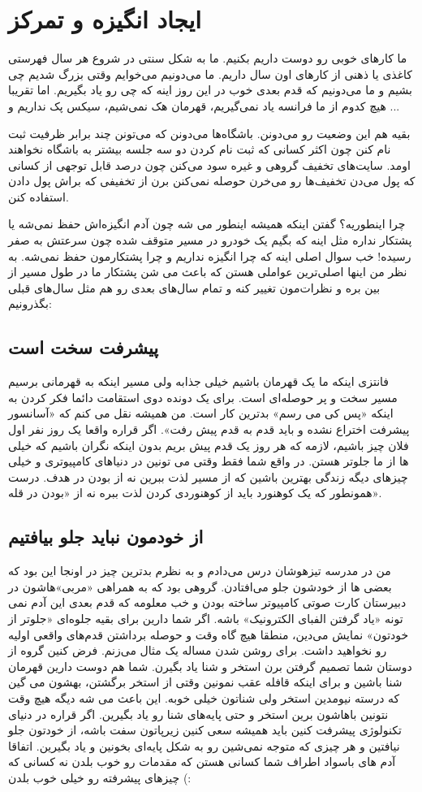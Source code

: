 \section{ایجاد انگیزه و تمرکز}
ما کارهای خوبی رو دوست داریم بکنیم. ما به شکل سنتی در شروع هر سال فهرستی کاغذی یا ذهنی از کارهای اون سال داریم. ما می‌دونیم می‌خوایم وقتی بزرگ شدیم چی بشیم و ما می‌دونیم که قدم بعدی خوب در این روز اینه که چی رو یاد بگیریم. اما تقریبا هیچ کدوم از ما فرانسه یاد نمی‌گیریم، قهرمان هک نمی‌شیم، سیکس پک نداریم و ...

بقیه هم این وضعیت رو می‌دونن. باشگاه‌ها می‌دونن که می‌تونن چند برابر ظرفیت ثبت نام کنن چون اکثر کسانی که ثبت نام کردن دو سه جلسه بیشتر به باشگاه نخواهند اومد. سایت‌های تخفیف گروهی و غیره سود می‌کنن چون درصد قابل توجهی از کسانی که پول می‌دن تخفیف‌ها رو می‌خرن حوصله نمی‌کنن برن از تخفیفی که براش پول دادن استفاده کنن.

چرا اینطوریه؟ گفتن اینکه همیشه اینطور می شه چون آدم انگیزه‌اش حفظ نمی‌شه یا پشتکار نداره مثل اینه که بگیم یک خودرو در مسیر متوقف شده چون سرعتش به صفر رسیده! خب سوال اصلی اینه که چرا انگیزه نداریم و چرا پشتکارمون حفظ نمی‌شه. به نظر من اینها اصلی‌ترین عواملی هستن که باعث می شن پشتکار ما در طول مسیر از بین بره و نظرات‌مون تغییر کنه و تمام سال‌های بعدی رو هم مثل سال‌های قبلی بگذرونیم:
\subsection*{پیشرفت سخت است}
فانتزی اینکه ما یک قهرمان باشیم خیلی جذابه ولی مسیر اینکه به قهرمانی برسیم مسیر سخت و پر حوصله‌ای است. برای یک دونده دوی استقامت دائما فکر کردن به اینکه‌ «پس کی می رسم» بدترین کار است. من همیشه نقل می کنم که «آسانسور پیشرفت اختراع نشده و باید قدم به قدم پیش رفت». اگر قراره واقعا یک روز نفر اول فلان چیز باشیم، لازمه که هر روز یک قدم پیش بریم بدون اینکه نگران باشیم که خیلی ها از ما جلوتر هستن. در واقع شما فقط وقتی می تونین در دنیاهای کامپیوتری و خیلی چیزهای دیگه زندگی بهترین باشین که از مسیر لذت ببرین نه از بودن در هدف. درست همونطور که یک کوهنورد باید از کوهنوردی کردن لذت ببره نه از «بودن در قله».
\subsection*{از خودمون نباید جلو بیافتیم}
من در مدرسه تیزهوشان درس می‌دادم و به نظرم بدترین چیز در اونجا این بود که بعضی ها از خودشون جلو می‌افتادن. گروهی بود که به همراهی «مربی‌»هاشون در دبیرستان کارت صوتی کامپیوتر ساخته بودن و خب معلومه که قدم بعدی این آدم نمی تونه «یاد گرفتن الفبای الکترونیک» باشه. اگر شما دارین برای بقیه جلوه‌ای «جلوتر از خودتون» نمایش می‌دین، منطقا هیچ گاه وقت و حوصله برداشتن قدم‌های واقعی اولیه رو نخواهید داشت. برای روشن شدن مساله یک مثال می‌زنم. فرض کنین گروه از دوستان شما تصمیم گرفتن برن استخر و شنا یاد بگیرن. شما هم دوست دارین قهرمان شنا باشین و برای اینکه قافله عقب نمونین وقتی از استخر برگشتن، بهشون می گین که درسته نیومدین استخر ولی شناتون خیلی خوبه. این باعث می شه دیگه هیچ وقت نتونین باهاشون برین استخر و حتی پایه‌های شنا رو یاد بگیرین. اگر قراره در دنیای تکنولوژی پیشرفت کنین باید همیشه سعی کنین زیرپاتون سفت باشه، از خودتون جلو نیافتین و هر چیزی که متوجه نمی‌شین رو به شکل پایه‌ای بخونین و یاد بگیرین. اتفاقا آدم های باسواد اطراف شما کسانی هستن که مقدمات رو خوب بلدن نه کسانی که چیزهای پیشرفته رو خیلی خوب بلدن‌ (:
